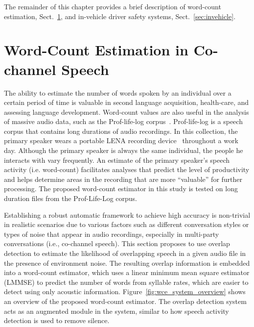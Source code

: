 The remainder of this chapter provides a brief description of word-count estimation, Sect.~\ref{sec:wce_cch}, and in-vehicle driver safety systems, Sect.~\ref{sec:invehicle}. 


\section{Word-Count Estimation in Co-channel Speech}
\label{sec:wce_cch}
The ability to estimate the number of words spoken by an individual over a certain period of time is valuable in second language acquisition, health-care, and assessing language development. 
Word-count values are also useful in the analysis of massive audio data, such as the Prof-life-log corpus~\cite{ziaei2013prof}. 
Prof-life-log is a speech corpus that contains long durations of audio recordings. In this collection, the primary speaker wears a portable LENA recording device~\cite{lena_device} throughout a work day. 
Although the primary speaker is always the same individual, the people he interacts with vary frequently. 
An estimate of the primary speaker's speech activity (i.e. word-count) facilitates analyses that predict the level of productivity and helps determine areas in the recording that are more ``valuable'' for further processing. 
The proposed word-count estimator in this study is tested on long duration files from the Prof-Life-Log corpus. 

Establishing a robust automatic framework to achieve high accuracy is non-trivial in realistic scenarios due to various factors such as different conversation styles or types of noise that appear in audio recordings, especially in multi-party conversations (i.e., co-channel speech). 
This section proposes to use overlap detection to estimate the likelihood of overlapping speech in a given audio file in the presence of environment noise. 
The resulting overlap information is embedded into a word-count estimator, which uses a linear minimum mean square estimator (LMMSE) to predict the number of words from syllable rates, which are easier to detect using only acoustic information. 
Figure~\ref{fig:wce_system_overview} shows an overview of the proposed word-count estimator. 
The overlap detection system acts as an augmented module in the system, similar to how speech activity detection is used to remove silence. 

